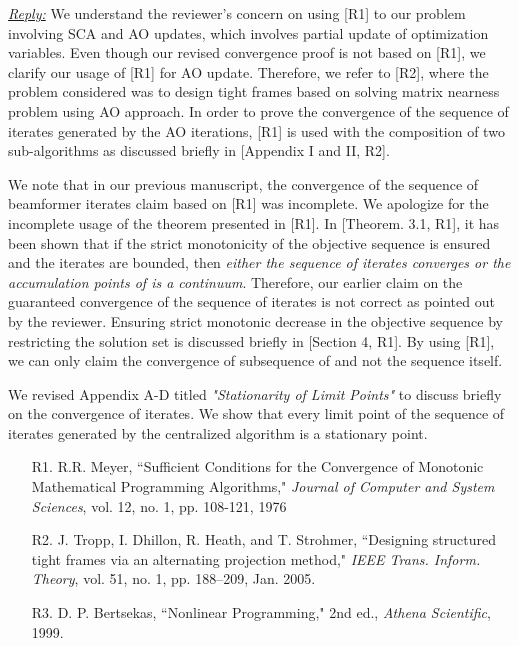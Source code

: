 \begin{itemize}
	\vspace{1eM}
	\underline{\textit{Reply:}} We understand the reviewer's concern on using [R1] to our problem involving \ac{SCA} and \ac{AO} updates, which involves partial update of optimization variables. Even though our revised convergence proof is not based on [R1], we clarify our usage of [R1] for \ac{AO} update. Therefore, we refer to [R2], where the problem considered was to design tight frames based on solving matrix nearness problem using \ac{AO} approach. In order to prove the convergence of the sequence of iterates generated by the \ac{AO} iterations, [R1] is used with the composition of two sub-algorithms as discussed briefly in [Appendix I and II, R2].
		
	We note that in our previous manuscript, the convergence of the sequence of beamformer iterates claim based on [R1] was incomplete. We apologize for the incomplete usage of the theorem presented in [R1]. In [Theorem. 3.1, R1], it has been shown that if the strict monotonicity of the objective sequence is ensured and the iterates are bounded, then \textit{either the sequence of iterates converges or the accumulation points of  is a continuum}. Therefore, our earlier claim on the guaranteed convergence of the sequence of iterates is not correct as pointed out by the reviewer. Ensuring strict monotonic decrease in the objective sequence by restricting the solution set is discussed briefly in [Section 4, R1]. By using [R1], we can only claim the convergence of subsequence of  and not the sequence itself.
	
	We revised Appendix A-D titled \textit{"Stationarity of Limit Points"} to discuss briefly on the convergence of iterates. We show that every limit point of the sequence of iterates generated by the centralized algorithm is a stationary point.
	
	\vspace{1eM}
	\begin{itemize}
		
		\item[R1.] R.R. Meyer, ``Sufficient Conditions for the Convergence of Monotonic Mathematical Programming Algorithms," \emph{Journal of Computer and System Sciences}, vol. 12, no. 1, pp. 108-121, 1976
		\item[R2.] J. Tropp, I. Dhillon, R. Heath, and T. Strohmer, ``Designing structured tight frames via an alternating projection method," \emph{IEEE Trans. Inform. Theory}, vol. 51, no. 1, pp. 188–209, Jan. 2005.
		\item[R3.] D. P. Bertsekas, ``Nonlinear Programming," 2nd ed., \emph{Athena Scientific}, 1999.
	\end{itemize}
	
\end{itemize}